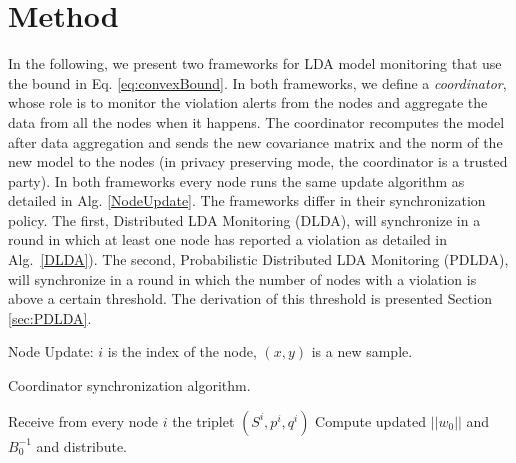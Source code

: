 \section{Method}
In the following, we present two frameworks for LDA model monitoring that use
the bound in Eq. \ref{eq:convexBound}. 
In both frameworks, 
we define a \textit{coordinator}, whose role is to monitor the violation alerts from the nodes and aggregate the data from all the nodes when it happens. The coordinator recomputes the model after data aggregation and sends the new covariance matrix and the norm of the new model to the nodes (in privacy preserving mode, the coordinator is a trusted party).
In both frameworks every node runs the same
update algorithm as detailed in Alg. \ref{NodeUpdate}.
The frameworks differ in their synchronization policy. 
The first, Distributed LDA Monitoring (DLDA), will synchronize in a round
in which at least one node has reported a violation as detailed in Alg.~\ref{DLDA}).
The second, Probabilistic Distributed LDA Monitoring (PDLDA), will synchronize in a round in which the number of nodes with a violation is above a certain
threshold.
The derivation of this threshold is presented Section \ref{sec:PDLDA}.


\begin{algorithm}
\caption{Node Update: $i$ is the index of the node, $(x,y)$ is a new sample.}
\label{NodeUpdate}
\end{algorithm}

\begin{algorithm}
\caption{Coordinator synchronization algorithm.}\label{DLDA}
\begin{algorithmic}[1]
\State Receive from every node $i$ the triplet $(S^i,p^i,q^i)$
\State Compute updated $||w_0||$ and $B_0^{-1}$ and distribute.
\EndIf
\EndProcedure
\end{algorithmic}
\end{algorithm}

